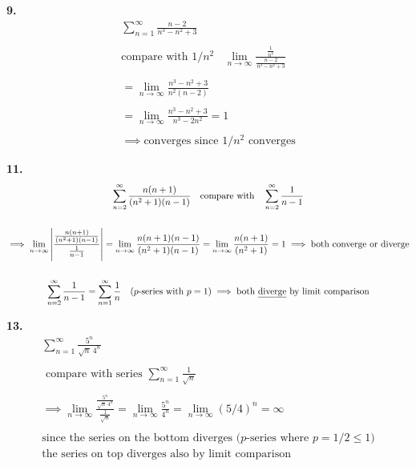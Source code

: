 \documentclass{article}
\begin{document}
\newpage



\noindent
\textbf{
9.
}
\\
\begin{gather*}
\sum_{n=1}^{\infty} \frac{n-2}{n^3-n^2+3}
\\
\\
\text{compare with } 1/n^2
~~~~
\lim_{n \to \infty} \frac{\frac{1}{n^2}}{\frac{n-2}{n^3-n^2+3}}
\\
\\
=\lim_{n \to \infty} \frac{n^3-n^2+3}{n^2(n-2)}
\\
\\
=\lim_{n \to \infty} \frac{n^3-n^2+3}{n^3-2n^2}=1
\\
\\
\implies
\text{converges since $1/n^2$ converges}
\end{gather*}



\noindent
\textbf{
11.
}
\\
\begin{gather*}
\sum_{n=2}^{\infty} \frac{n(n+1)}{(n^2+1)(n-1)}
~~~\text{compare with}~~~
\sum_{n=2}^{\infty} \frac{1}{n-1}
\\
\\
\implies
\lim_{n \to \infty} \left| \frac{\frac{n(n+1)}{(n^2+1)(n-1)}}{\frac{1}{n-1}} \right|
=\lim_{n \to \infty} \frac{n(n+1)(n-1)}{(n^2+1)(n-1)}
=\lim_{n \to \infty} \frac{n(n+1)}{(n^2+1)}=1 \implies \text{both converge or diverge}
\\
\\
\sum_{n=2}^{\infty} \frac{1}{n-1}
=\sum_{n=1}^{\infty} \frac{1}{n}
~~~\text{($p$-series with $p=1$)} \implies \text{both \underline{diverge} by limit comparison}
\end{gather*}



\noindent
\textbf{
13.
}
\\
\begin{gather*}
\sum_{n=1}^{\infty} \frac{5^n}{\sqrt{n}~4^n}
\\
\\
\text{ compare with series }
\sum_{n=1}^{\infty} \frac{1}{\sqrt{n}}
\\
\\
\implies
\lim_{n \to \infty} \frac{\frac{5^n}{\sqrt{n}~4^n}}{\frac{1}{\sqrt{n}}}
= \lim_{n \to \infty} \frac{5^n}{4^n}= \lim_{n \to \infty}(5/4)^n=\infty
\\
\\
\text{since the series on the bottom diverges ($p$-series where $p=1/2\leq1$)}
\\
\text{the series on top diverges also by limit comparison}
\end{gather*}
\end{document}
